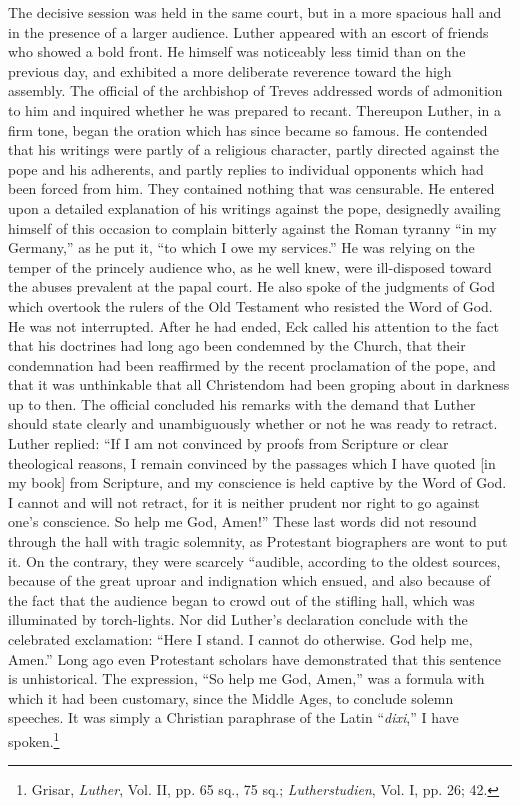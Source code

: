 The decisive session was held in the same court, but in a more
spacious hall and in the presence of a larger audience. Luther appeared
with an escort of friends who showed a bold front. He himself was noticeably
less timid than on the previous day, and exhibited
a more deliberate reverence toward the high assembly. The official of
the archbishop of Treves addressed words of admonition to him
and inquired whether he was prepared to recant. Thereupon Luther,
in a firm tone, began the oration which has since became so famous.
He contended that his writings were partly of a religious character,
partly directed against the pope and his adherents, and partly replies
to individual opponents which had been forced from him. They
contained nothing that was censurable. He entered upon a detailed
explanation of his writings against the pope, designedly availing
himself of this occasion to complain bitterly against the Roman
tyranny “in my Germany,” as he put it, “to which I owe my services.”
He was relying on the temper of the princely audience who,
as he well knew, were ill-disposed toward the abuses prevalent at
the papal court. He also spoke of the judgments of God which
overtook the rulers of the Old Testament who resisted the Word
of God. He was not interrupted. After he had ended, Eck called his
attention to the fact that his doctrines had long ago been condemned
by the Church, that their condemnation had been reaffirmed by
the recent proclamation of the pope, and that it was unthinkable
that all Christendom had been groping about in darkness up to
then. The official concluded his remarks with the demand that
Luther should state clearly and unambiguously whether or not he
was ready to retract. Luther replied: “If I am not convinced by
proofs from Scripture or clear theological reasons, I remain convinced
by the passages which I have quoted [in my book] from
Scripture, and my conscience is held captive by the Word of God.
I cannot and will not retract, for it is neither prudent nor right to
go against one’s conscience. So help me God, Amen!” These last words
did not resound through the hall with tragic solemnity, as Protestant
biographers are wont to put it. On the contrary, they were scarcely
“audible, according to the oldest sources, because of the great uproar
and indignation which ensued, and also because of the fact that the
audience began to crowd out of the stifling hall, which was illuminated
by torch-lights. Nor did Luther’s declaration conclude with
the celebrated exclamation: “Here I stand. I cannot do otherwise.
God help me, Amen.” Long ago even Protestant scholars have
demonstrated that this sentence is unhistorical. The expression, “So
help me God, Amen,” was a formula with which it had been customary, since
the Middle Ages, to conclude solemn speeches. It was
simply a Christian paraphrase of the Latin ``\textit{dixi},'' I have spoken.\footnote
{Grisar, \textit{Luther}, Vol. II, pp. 65 sq., 75 sq.; \textit{Lutherstudien}, Vol. I, pp. 26; 42.}

